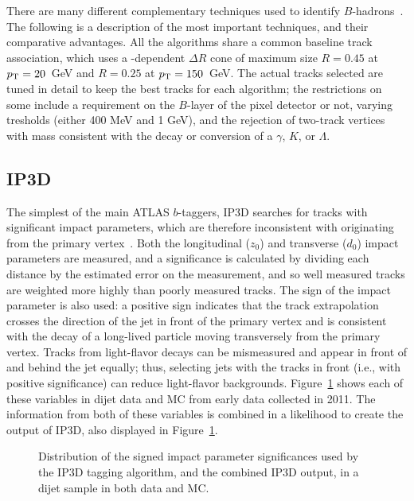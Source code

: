 There are many different complementary techniques used to identify $B$-hadrons~\cite{ATLAS-B}. The following is a description of the most important techniques, and their comparative advantages. All the algorithms share a common baseline track association, which uses a \pt-dependent $\Delta R$ cone of maximum size $R=0.45$ at $p_{\text{T}} = 20$~GeV and $R=0.25$ at $p_{\text{T}} = 150$~GeV. The actual tracks selected are tuned in detail to keep the best tracks for each algorithm; the restrictions on some include a requirement on the $B$-layer of the pixel detector or not, varying \pt tresholds (either 400 MeV and 1 GeV), and the rejection of two-track vertices with mass consistent with the decay or conversion of a $\gamma$, $K$, or $\Lambda$.

\subsection{IP3D}

The simplest of the main ATLAS $b$-taggers, IP3D searches for tracks with significant impact parameters, which are therefore inconsistent with originating from the primary vertex~\cite{ATLAS-B}. Both the longitudinal ($z_0$) and transverse ($d_0$) impact parameters are measured, and a significance is calculated by dividing each distance by the estimated error on the measurement, and so well measured tracks are weighted more highly than poorly measured tracks. The sign of the impact parameter is also used: a positive sign indicates that the track extrapolation crosses the direction of the jet in front of the primary vertex and is consistent with the decay of a long-lived particle moving transversely from the primary vertex. Tracks from light-flavor decays can be mismeasured and appear in front of and behind the jet equally; thus, selecting jets with the tracks in front (i.e., with positive significance) can reduce light-flavor backgrounds. Figure~\ref{fig:jet-reconstruction:b-tagging:ip3d} shows each of these variables in dijet data and MC from early data collected in 2011. The information from both of these variables is combined in a likelihood to create the output of IP3D, also displayed in Figure~\ref{fig:jet-reconstruction:b-tagging:ip3d}.


\begin{figure}
\centering
{}
\caption{Distribution of the signed impact parameter significances used by the IP3D tagging algorithm, and the combined IP3D output, in a dijet sample in both data and MC.}
\label{fig:jet-reconstruction:b-tagging:ip3d}
\end{figure}

